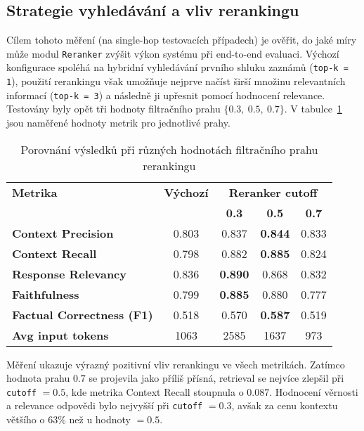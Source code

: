 \subsection{Strategie vyhledávání a vliv rerankingu}
\label{cutoff}
Cílem tohoto měření (na single-hop testovacích případech) je ověřit, do jaké míry může modul \texttt{Reranker} zvýšit výkon systému při end-to-end evaluaci. Výchozí konfigurace spoléhá na hybridní vyhledávání prvního shluku zaznámů (\texttt{top-k = 1}), použití rerankingu však umožňuje nejprve načíst širší množinu relevantních informací (\texttt{top-k = 3}) a následně ji upřesnit pomocí hodnocení relevance. Testovány byly opět tři hodnoty filtračního prahu $\{0.3,\ 0.5,\ 0.7\}$. V tabulce~\ref{tab:rerank} jsou naměřené hodnoty metrik pro jednotlivé prahy.

\begin{table}[H]
\centering
\begin{tabular}{lcccc}
\toprule
\textbf{Metrika} & \textbf{Výchozí} & \multicolumn{3}{c}{\textbf{Reranker cutoff}} \\
 & & \textbf{0.3} & \textbf{0.5} & \textbf{0.7} \\
\midrule
\textbf{Context Precision}         & 0.803 & 0.837 & \textbf{0.844} & 0.833 \\
\textbf{Context Recall}            & 0.798 & 0.882 & \textbf{0.885} & 0.824 \\
\textbf{Response Relevancy}        & 0.836 & \textbf{0.890} & 0.868 & 0.832 \\
\textbf{Faithfulness}              & 0.799 & \textbf{0.885} & 0.880 & 0.777 \\
\textbf{Factual Correctness (F1)}  & 0.518 & 0.570 & \textbf{0.587} & 0.519 \\
\textbf{Avg input tokens}          & 1063  & 2585  & 1637  & 973 \\
\bottomrule
\end{tabular}
\caption{Porovnání výsledků při různých hodnotách filtračního prahu rerankingu}
\label{tab:rerank}
\end{table}

Měření ukazuje výrazný pozitivní vliv rerankingu ve všech metrikách. Zatímco hodnota prahu $0.7$ se projevila jako příliš přísná, retrieval se nejvíce zlepšil při \texttt{cutoff} $=0.5$, kde metrika Context Recall stoupnula o $0.087$. Hodnocení věrnosti a relevance odpovědi bylo nejvyšší při \texttt{cutoff} $=0.3$, avšak za cenu kontextu většího o 63\% než u hodnoty $=0.5$. 


